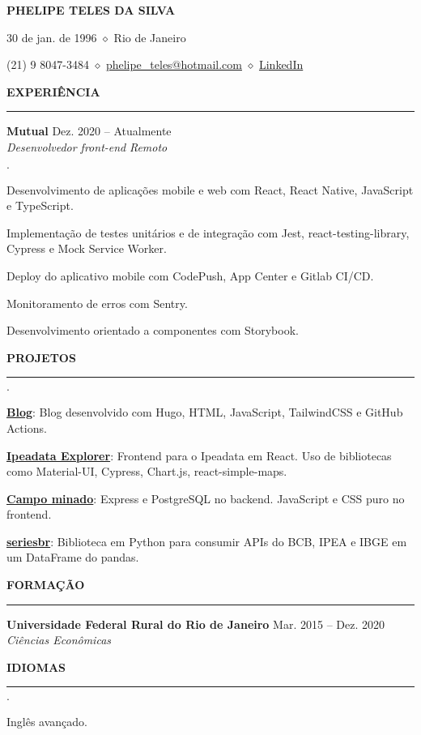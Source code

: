 \documentclass[11pt,letterpaper]{article}
\newenvironment{tightlist}
  {\begin{list}
    {$\cdot$}
    {
      \setlength{\leftmargin}{0em}
      \setlength{\itemsep}{-0.5em}
    }
  }
{\end{list}}
\begin{document}
\centerline{\huge\bf PHELIPE TELES DA SILVA}
\medskip

\centerline{30 de jan. de 1996 $\diamond$ Rio de Janeiro}
\smallskip

\centerline{
  (21) 9 8047-3484 $\diamond$
  \href{mailto:phelipe_teles@hotmail.com}{phelipe\_teles@hotmail.com} $\diamond$ \href{https://linkedin.com/in/phelipeteles}{LinkedIn}
}
\smallskip

\medskip \textbf{EXPERIÊNCIA} \medskip
\hrule

\textbf{Mutual} \hfill Dez. 2020 -- Atualmente \\
\emph{Desenvolvedor front-end} \hfill \emph{Remoto} {\parfillskip=0pt\par}

\begin{tightlist}
  \item Desenvolvimento de aplicações mobile e web com React, React Native,
    JavaScript e TypeScript.
  \item Implementação de testes unitários e de integração com Jest,
    react-testing-library, Cypress e Mock Service Worker.
  \item Deploy do aplicativo mobile com CodePush, App Center e Gitlab CI/CD.
  \item Monitoramento de erros com Sentry.
  \item Desenvolvimento orientado a componentes com Storybook.
\end{tightlist}

\medskip \textbf{PROJETOS} \medskip
\hrule

\begin{tightlist}
 \item \href{https://phelipetls.github.io}{\textbf{Blog}}: Blog desenvolvido com
   Hugo, HTML, JavaScript, TailwindCSS e GitHub Actions.
 \item \href{http://ipeadata-explorer.surge.sh}{\textbf{Ipeadata Explorer}}:
   Frontend para o Ipeadata em React. Uso de bibliotecas como Material-UI,
   Cypress, Chart.js, react-simple-maps.
 \item \href{https://github.com/phelipetls/minesweeper.js}{\textbf{Campo minado}}:
   Express e PostgreSQL no backend. JavaScript e CSS puro no frontend.
 \item \href{https://github.com/phelipetls/seriesbr}{\textbf{seriesbr}}:
   Biblioteca em Python para consumir APIs do BCB, IPEA e IBGE em um DataFrame
   do pandas.
\end{tightlist}

\medskip \textbf{FORMAÇÃO} \medskip
\hrule

\textbf{Universidade Federal Rural do Rio de Janeiro} \hfill {Mar. 2015 -- Dez. 2020} \\
\emph{Ciências Econômicas}

\medskip \textbf{IDIOMAS} \medskip
\hrule

\begin{tightlist}
  \item Inglês avançado.
\end{tightlist}
\end{document}
